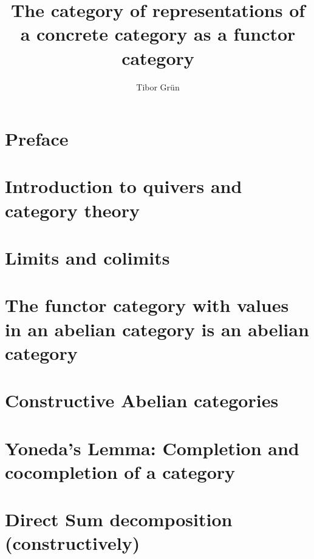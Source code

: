\documentclass{article}
\title{The category of representations of a concrete category as a functor category}
\author{Tibor Gr{\"u}n}
\begin{document}

	\maketitle

	\newpage

	\tableofcontents\label{toc}
	
	\newpage

	
\section*{Preface}

\section{Introduction to quivers and category theory}


\section{Limits and colimits}


\section{The functor category with values in an abelian category is an abelian category}


\section{Constructive Abelian categories}



\section{Yoneda's Lemma: Completion and cocompletion of a category}


\section{Direct Sum decomposition (constructively)}

\end{document}
